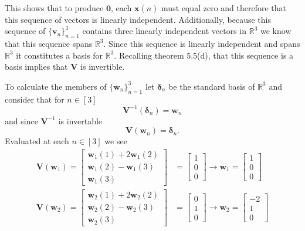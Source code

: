 \documentclass[12pt]{amsart}
\newcommand{\1}{\mathbbm{1}}
\numberwithin{equation}{section}
\numberwithin{Theorem}{section}
\theoremstyle{plain} %
\theoremstyle{definition}
\theoremstyle{remark}
\begin{document}
\begin{enumerate}[1.]
This shows that to produce $\mathbf{0}$, each $\mathbf{x}(n)$ must equal zero and therefore that this sequence of vectors is linearly independent. 
Additionally, because this sequence of \(\{\mathbf{v}_{n}\}_{n=1}^{3}\) contains three linearly independent vectors in $\mathbb{R}^3$ we know that this sequence spans $\mathbb{R}^3$. 
Since this sequence is linearly independent and spans $\mathbb{R}^3$ it constitutes a basis for $\mathbb{R}^3$. 
Recalling theorem 5.5(d), that this sequence is a basis implies that \(\mathbf{V}\) is invertible.

To calculate the members of \(\{\mathbf{w}_{n}\}_{n=1}^{3}\) let
$\boldsymbol{\delta}_n$ be the standard basis of $\mathbb{R}^3$ and
consider that for $n\in[3]$ 
\[
\mathbf{V}^{-1}(\boldsymbol{\delta}_n) = \mathbf{w}_n  
\]
and since $\mathbf{V}^{-1}$ is invertable
\[
\mathbf{V}(\mathbf{w}_n) = \boldsymbol{\delta}_n .
\]
Evaluated at each $n\in[3]$ we see
\begin{align*}
	\mathbf{V}(\mathbf{w}_1) =
	\begin{bmatrix}
		\mathbf{w}_1(1) + 2\mathbf{w}_1(2) \\
		\mathbf{w}_1(2) -  \mathbf{w}_1(3) \\
		\mathbf{w}_1(3)
	\end{bmatrix}
	&= 
	\begin{bmatrix} 1 \\ 0 \\ 0 \end{bmatrix}
	\rightarrow
	\mathbf{w}_1 =
	\begin{bmatrix} 1 \\ 0 \\ 0 \end{bmatrix}
	\\
	\mathbf{V}(\mathbf{w}_2) =
	\begin{bmatrix}
		\mathbf{w}_2(1) + 2\mathbf{w}_2(2) \\
		\mathbf{w}_2(2) -  \mathbf{w}_2(3) \\
		\mathbf{w}_2(3)
	\end{bmatrix}
	&= 
	\begin{bmatrix} 0 \\ 1 \\ 0 \end{bmatrix}
	\rightarrow
	\mathbf{w}_2 =
	\begin{bmatrix} -2 \\ 1 \\ 0 \end{bmatrix}
	\\

\end{align*}
\end{enumerate}
\end{document}
